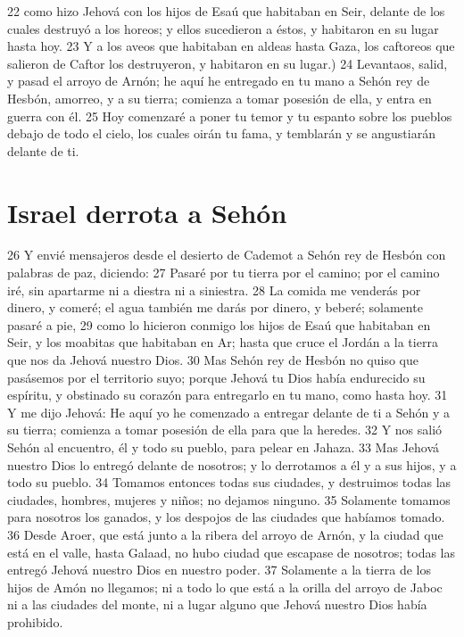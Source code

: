 22 como hizo Jehová con los hijos de Esaú que habitaban en Seir, delante de los cuales destruyó a los horeos; y ellos sucedieron a éstos, y habitaron en su lugar hasta hoy.
23 Y a los aveos que habitaban en aldeas hasta Gaza, los caftoreos que salieron de Caftor los destruyeron, y habitaron en su lugar.)
24 Levantaos, salid, y pasad el arroyo de Arnón; he aquí he entregado en tu mano a Sehón rey de Hesbón, amorreo, y a su tierra; comienza a tomar posesión de ella, y entra en guerra con él.
25 Hoy comenzaré a poner tu temor y tu espanto sobre los pueblos debajo de todo el cielo, los cuales oirán tu fama, y temblarán y se angustiarán delante de ti.

\section{Israel derrota a Sehón }

26 Y envié mensajeros desde el desierto de Cademot a Sehón rey de Hesbón con palabras de paz, diciendo:
27 Pasaré por tu tierra por el camino; por el camino iré, sin apartarme ni a diestra ni a siniestra.
28 La comida me venderás por dinero, y comeré; el agua también me darás por dinero, y beberé; solamente pasaré a pie,
29 como lo hicieron conmigo los hijos de Esaú que habitaban en Seir, y los moabitas que habitaban en Ar; hasta que cruce el Jordán a la tierra que nos da Jehová nuestro Dios.
30 Mas Sehón rey de Hesbón no quiso que pasásemos por el territorio suyo; porque Jehová tu Dios había endurecido su espíritu, y obstinado su corazón para entregarlo en tu mano, como hasta hoy.
31 Y me dijo Jehová: He aquí yo he comenzado a entregar delante de ti a Sehón y a su tierra; comienza a tomar posesión de ella para que la heredes.
32 Y nos salió Sehón al encuentro, él y todo su pueblo, para pelear en Jahaza.
33 Mas Jehová nuestro Dios lo entregó delante de nosotros; y lo derrotamos a él y a sus hijos, y a todo su pueblo.
34 Tomamos entonces todas sus ciudades, y destruimos todas las ciudades, hombres, mujeres y niños; no dejamos ninguno.
35 Solamente tomamos para nosotros los ganados, y los despojos de las ciudades que habíamos tomado.
36 Desde Aroer, que está junto a la ribera del arroyo de Arnón, y la ciudad que está en el valle, hasta Galaad, no hubo ciudad que escapase de nosotros; todas las entregó Jehová nuestro Dios en nuestro poder.
37 Solamente a la tierra de los hijos de Amón no llegamos; ni a todo lo que está a la orilla del arroyo de Jaboc ni a las ciudades del monte, ni a lugar alguno que Jehová nuestro Dios había prohibido.

